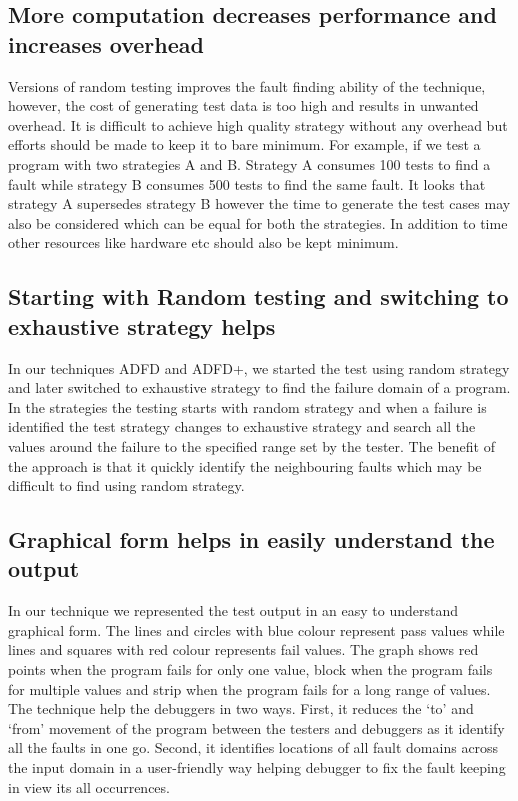 \subsection{More computation decreases performance and increases overhead}
Versions of random testing \cite{} improves the fault finding ability of the technique, however, the cost of generating test data is too high and results in unwanted overhead. It is difficult to achieve high quality strategy without any overhead but efforts should be made to keep it to bare minimum. For example, if we test a program with two strategies A and B. Strategy A consumes 100 tests to find a fault while strategy B consumes 500 tests to find the same fault.  It looks that strategy A supersedes strategy B however the time to generate the test cases may also be considered which can be equal for both the strategies. In addition to time other resources like hardware etc should also be kept minimum.


\subsection{Starting with Random testing and switching to exhaustive strategy helps}
In our techniques ADFD and ADFD+, we started the test using random strategy and later switched to exhaustive strategy to find the failure domain of a program. In the strategies the testing starts with random strategy and when a failure is identified the test strategy changes to exhaustive strategy and search all the values around the failure to the specified range set by the tester. The benefit of the approach is that it quickly identify the neighbouring faults which may be difficult to find using random strategy. 


\subsection{Graphical form helps in easily understand the output}
In our technique we represented the test output in an easy to understand graphical form. The lines and circles with blue colour represent pass values while lines and squares with red colour represents fail values. The graph shows red points when the program fails for only one value, block when the program fails for multiple values and strip when the program fails for a long range of values.  The technique help the debuggers in two ways. First, it reduces the `to' and `from' movement of the program between the testers and debuggers as it identify all the faults in one go. Second, it identifies locations of all fault domains across the input domain in a user-friendly way helping debugger to fix the fault keeping in view its all occurrences.



